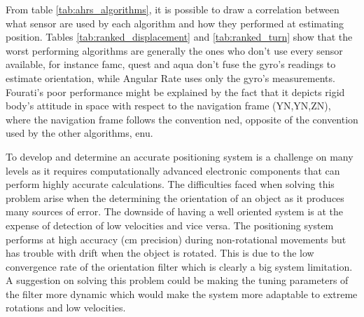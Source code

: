From table \ref{tab:ahrs_algorithms}, it is possible to draw a correlation between what sensor are used by each algorithm and how they performed at estimating position. Tables \ref{tab:ranked_displacement} and \ref{tab:ranked_turn} show that the worst performing algorithms are generally the ones who don't use every sensor available, for instance \acrshort{famc}, \acrshort{quest} and \acrshort{aqua} don't fuse the gyro's readings to estimate orientation, while Angular Rate uses only the gyro's measurements. Fourati's poor performance might be explained by the fact that it depicts rigid body's attitude in space with respect to the navigation frame (YN,YN,ZN), where the navigation frame follows the convention \acrfull{ned}, opposite of the convention used by the other algorithms, \acrfull{enu}.


To develop and determine an accurate positioning system is a challenge on many levels as it requires computationally advanced electronic components that can perform highly accurate calculations. The difficulties faced when solving this problem arise when the determining the orientation of an object as it produces many sources of error. The downside of having a well oriented system is at the expense of detection of low velocities and vice versa. The positioning system performs at high accuracy (cm precision) during non-rotational movements but has trouble with drift when the object is rotated. This is due to the low convergence rate of the orientation filter which is clearly a big system limitation. A suggestion on solving this problem could be making the tuning parameters of the filter more dynamic which would make the system more adaptable to extreme rotations and low velocities.

